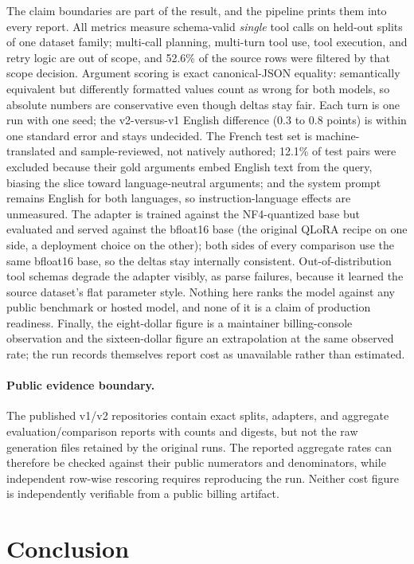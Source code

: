 \documentclass{article}
\begin{document}
The claim boundaries are part of the result, and the pipeline prints them into every report. All metrics measure schema-valid \emph{single} tool calls on held-out splits of one dataset family; multi-call planning, multi-turn tool use, tool execution, and retry logic are out of scope, and 52.6\% of the source rows were filtered by that scope decision. Argument scoring is exact canonical-JSON equality: semantically equivalent but differently formatted values count as wrong for both models, so absolute numbers are conservative even though deltas stay fair. Each turn is one run with one seed; the v2-versus-v1 English difference (0.3 to 0.8 points) is within one standard error and stays undecided. The French test set is machine-translated and sample-reviewed, not natively authored; 12.1\% of test pairs were excluded because their gold arguments embed English text from the query, biasing the slice toward language-neutral arguments; and the system prompt remains English for both languages, so instruction-language effects are unmeasured. The adapter is trained against the NF4-quantized base but evaluated and served against the bfloat16 base (the original QLoRA recipe on one side, a deployment choice on the other); both sides of every comparison use the same bfloat16 base, so the deltas stay internally consistent. Out-of-distribution tool schemas degrade the adapter visibly, as parse failures, because it learned the source dataset's flat parameter style. Nothing here ranks the model against any public benchmark or hosted model, and none of it is a claim of production readiness. Finally, the eight-dollar figure is a maintainer billing-console observation and the sixteen-dollar figure an extrapolation at the same observed rate; the run records themselves report cost as unavailable rather than estimated.

\paragraph{Public evidence boundary.}
The published v1/v2 repositories contain exact splits, adapters, and aggregate evaluation/comparison reports with counts and digests, but not the raw generation files retained by the original runs. The reported aggregate rates can therefore be checked against their public numerators and denominators, while independent row-wise rescoring requires reproducing the run. Neither cost figure is independently verifiable from a public billing artifact.

\section{Conclusion}
\label{sec:conclusion}
\end{document}
